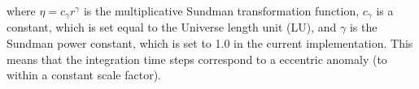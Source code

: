 \noindent where $\eta = c_{\gamma}r^{\gamma}$ is the multiplicative Sundman transformation function, $c_{\gamma}$ is a constant, which is set equal to the Universe length unit (LU), and $\gamma$ is the Sundman power constant, which is set to 1.0 in the current implementation. This means that the integration time steps correspond to a eccentric anomaly (to within a constant scale factor).




